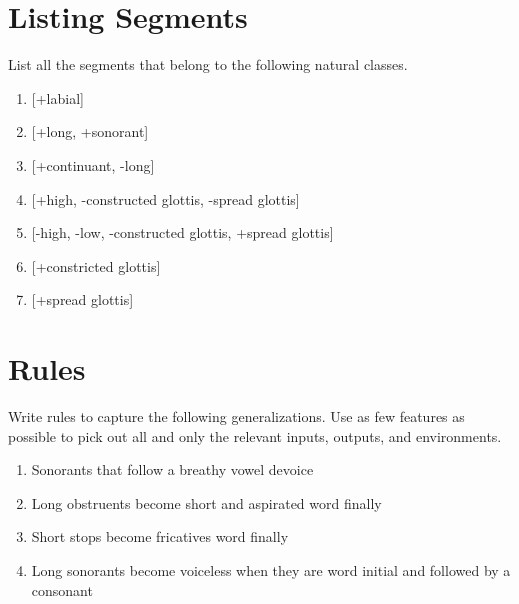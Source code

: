 \documentclass[12pt, letterpaper]{article}
\begin{document}
\section{Listing Segments} 

List all the segments that belong to the following natural classes.

\begin{enumerate}
	\item {}[+labial]
	\item {}[+long, +sonorant]
	\item {}[+continuant, -long]
	\item {}[+high, -constructed glottis, -spread glottis]
	\item {}[-high, -low, -constructed glottis, +spread glottis]
	\item {}[+constricted glottis]
	\item {}[+spread glottis]
\end{enumerate}

\section{Rules} 

Write rules to capture the following generalizations. Use as few features as possible to pick out all and only the relevant inputs, outputs, and environments.

\begin{enumerate}

	\item Sonorants that follow a breathy vowel devoice 
	\vspace{1cm}
	\item Long obstruents become short and aspirated word finally
	\vspace{1cm}
	\item Short stops become fricatives word finally
	\vspace{1cm}
	\item Long sonorants become voiceless when they are word initial and followed by a consonant
\end{enumerate}


\printbibliography[heading=bibintoc]
\end{document}
